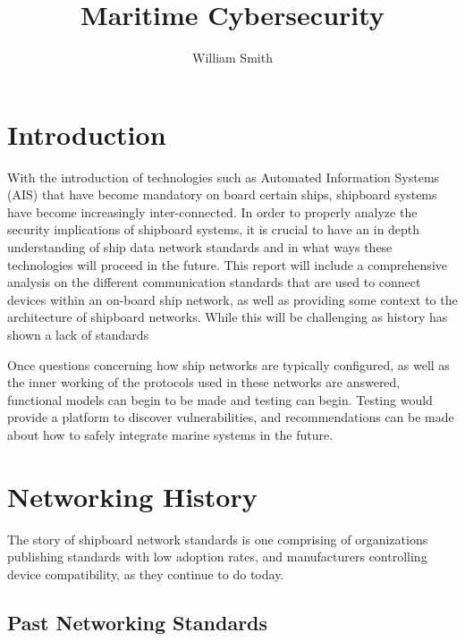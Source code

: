\documentclass{report}
\title{Maritime Cybersecurity}
\author{William Smith}
\begin{document}
\maketitle
\begin{abstract}
\end{abstract}


\chapter{Introduction}

With the introduction of technologies such as Automated Information Systems (AIS) that have become mandatory on board certain ships, shipboard systems have become increasingly inter-connected. In order to properly analyze the security implications of shipboard systems, it is crucial to have an in depth understanding of ship data network standards and in what ways these technologies will proceed in the future. This report will include a comprehensive analysis on the different communication standards that are used to connect devices within an on-board ship network, as well as providing some context to the architecture of shipboard networks. While this will be challenging as history has shown a lack of standards 

Once questions concerning how ship networks are typically configured, as well as the inner working of the protocols used in these networks are answered, functional models can begin to be made and testing can begin. Testing would provide a platform to discover vulnerabilities, and recommendations can be made about how to safely integrate marine systems in the future. 

 
\chapter{Networking History}
The story of shipboard network standards is one comprising of organizations publishing standards with low adoption rates, and manufacturers controlling device compatibility, as they continue to do today.

\section{Past Networking Standards}
\end{document}
